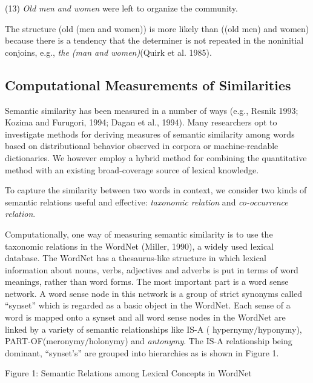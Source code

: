 \vspace*{4mm}

\hspace*{5mm}(13) {\it Old men and women} were left to organize the community.


\vspace*{4mm}
\hspace*{-5mm}The structure (old (men and women)) is more likely
than ((old men) and women) because there is a tendency that the determiner
is not repeated in the noninitial conjoins, e.g., {\it the
(man and women)}(Quirk et al. 1985). 


\subsection{Computational Measurements of Similarities}

Semantic similarity has been  measured in a number of ways (e.g., Resnik
1993; Kozima and Furugori, 1994; Dagan et al., 1994). Many researchers
opt to investigate methods for deriving measures of semantic 
similarity among words based on distributional behavior observed in corpora or 
machine-readable dictionaries. We however employ a hybrid 
method for combining the quantitative method with an existing
broad-coverage source of lexical knowledge.  
 
To capture the similarity between two words in context, we consider 
two kinds of semantic relations useful and effective: {\it taxonomic 
relation} and {\it co-occurrence relation}. 

Computationally, one way of measuring semantic similarity is to
use the taxonomic relations in the WordNet (Miller, 1990),
a widely used lexical database.
The WordNet has a thesaurus-like structure in which lexical information 
about nouns, verbs, adjectives 
and adverbs is put in terms of word meanings, rather than word forms. 
The most important part is a word sense network. A word sense node in this network is a group
of strict synonyms called ``synset'' which is regarded as a basic object in 
the WordNet. Each sense of a word is mapped onto a synset and all word sense 
nodes in the WordNet are linked by a variety of semantic relationships like IS-A (
hypernymy$/$hyponymy), PART-OF(meronymy$/$holonymy) and {\it antonymy}.
The IS-A relationship being dominant, ``synset's'' are grouped into hierarchies as is
shown in Figure 1. 

\vspace*{-2mm}
\begin{figure}[hbp]
 \begin{center}
 \end{center}
\end{figure}
\vspace*{-8mm}
\hspace*{1cm}Figure 1: Semantic Relations among Lexical Concepts in WordNet


